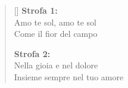 \begin{verse}[\baselineskip]
\textbf{Strofa 1:}\\
Amo te sol, amo te sol\\
Come il fior del campo\\


\textbf{Strofa 2:}\\
Nella gioia e nel dolore\\
Insieme sempre nel tuo amore
\end{verse}